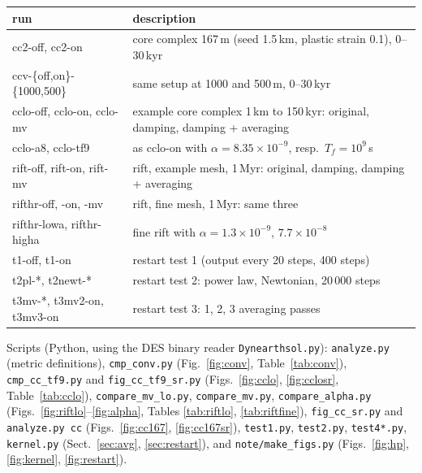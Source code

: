 \documentclass[11pt]{article}
\newcommand{\code}[1]{\texttt{#1}}
\begin{document}
\begin{table}[h]
  \centering\footnotesize
  \begin{tabular}{>{\ttfamily}l l}
  \toprule
  \normalfont run & description\\
  \midrule
  cc2-off, cc2-on & core complex 167\,m (seed 1.5\,km, plastic strain 0.1), 0--30\,kyr\\
  ccv-\{off,on\}-\{1000,500\} & same setup at 1000 and 500\,m, 0--30\,kyr\\
  cclo-off, cclo-on, cclo-mv & example core complex 1\,km to 150\,kyr: original, damping, damping + averaging\\
  cclo-a8, cclo-tf9 & as cclo-on with $\alpha=8.35\times10^{-9}$, resp.\ $T_f=10^9$\,s\\
  rift-off, rift-on, rift-mv & rift, example mesh, 1\,Myr: original, damping, damping + averaging\\
  rifthr-off, -on, -mv & rift, fine mesh, 1\,Myr: same three\\
  rifthr-lowa, rifthr-higha & fine rift with $\alpha=1.3\times10^{-9}$, $7.7\times10^{-8}$\\
  t1-off, t1-on & restart test 1 (output every 20 steps, 400 steps)\\
  t2pl-*, t2newt-* & restart test 2: power law, Newtonian, 20\,000 steps\\
  t3mv-*, t3mv2-on, t3mv3-on & restart test 3: 1, 2, 3 averaging passes\\
  \bottomrule
  \end{tabular}
\end{table}

\noindent Scripts (Python, using the DES binary reader \code{Dynearthsol.py}):
\code{analyze.py} (metric definitions), \code{cmp\_conv.py} (Fig.~\ref{fig:conv},
Table~\ref{tab:conv}), \code{cmp\_cc\_tf9.py} and \code{fig\_cc\_tf9\_sr.py}
(Figs.~\ref{fig:cclo}, \ref{fig:cclosr}, Table~\ref{tab:cclo}), \code{compare\_mv\_lo.py},
\code{compare\_mv.py}, \code{compare\_alpha.py} (Figs.~\ref{fig:riftlo}--\ref{fig:alpha}, Tables
\ref{tab:riftlo}, \ref{tab:riftfine}), \code{fig\_cc\_sr.py} and \code{analyze.py cc}
(Figs.~\ref{fig:cc167}, \ref{fig:cc167sr}), \code{test1.py}, \code{test2.py}, \code{test4*.py},
\code{kernel.py} (Sect.~\ref{sec:avg}, \ref{sec:restart}), and \code{note/make\_figs.py}
(Figs.~\ref{fig:hp}, \ref{fig:kernel}, \ref{fig:restart}).
\end{document}
